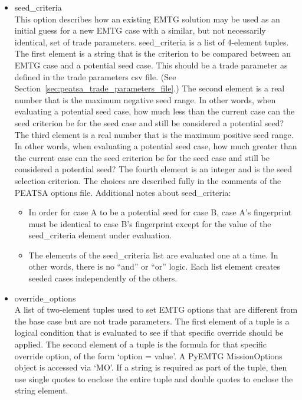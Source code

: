 \begin{itemize}
	\item seed\_criteria \\ This option describes how an existing \ac{EMTG} solution may be used as an initial guess for a new \ac{EMTG} case with a similar, but not necessarily identical, set of trade parameters. seed\_criteria is a list of 4-element tuples. The first element is a string that is the criterion to be compared between an \ac{EMTG} case and a potential seed case. This should be a trade parameter as defined in the trade parameters csv file. (See Section~\ref{sec:peatsa_trade_parameters_file}.) The second element is a real number that is the maximum negative seed range. In other words, when evaluating a potential seed case, how much less than the current case can the seed criterion be for the seed case and still be considered a potential seed? The third element is a real number that is the maximum positive seed range. In other words, when evaluating a potential seed case, how much greater than the current case can the seed criterion be for the seed case and still be considered a potential seed? The fourth element is an integer and is the seed selection criterion. The choices are described fully in the comments of the \ac{PEATSA} options file. Additional notes about seed\_criteria:
	\begin{itemize}
		\item In order for case A to be a potential seed for case B, case A's fingerprint must be identical to case B's fingerprint except for the value of the seed\_criteria element under evaluation.
		\item The elements of the seed\_criteria list are evaluated one at a time. In other words, there is no ``and'' or ``or'' logic. Each list element creates seeded cases independently of the others.
	\end{itemize}
	\item override\_options \\ A list of two-element tuples used to set \ac{EMTG} options that are different from the base case but are not trade parameters. The first element of a tuple is a logical condition that is evaluated to see if that specific override should be applied. The second element of a tuple is the formula for that specific override option, of the form `option = value'. A PyEMTG MissionOptions object is accessed via `MO'. If a string is required as part of the tuple, then use single quotes to enclose the entire tuple and double quotes to enclose the string element. 
	

\end{itemize}
